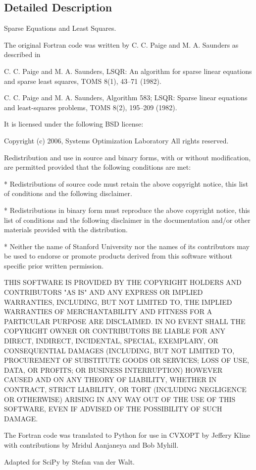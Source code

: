 \subsection{Detailed Description}
\begin{DoxyVerb}Sparse Equations and Least Squares.

The original Fortran code was written by C. C. Paige and M. A. Saunders as
described in

C. C. Paige and M. A. Saunders, LSQR: An algorithm for sparse linear
equations and sparse least squares, TOMS 8(1), 43--71 (1982).

C. C. Paige and M. A. Saunders, Algorithm 583; LSQR: Sparse linear
equations and least-squares problems, TOMS 8(2), 195--209 (1982).

It is licensed under the following BSD license:

Copyright (c) 2006, Systems Optimization Laboratory
All rights reserved.

Redistribution and use in source and binary forms, with or without
modification, are permitted provided that the following conditions are
met:

    * Redistributions of source code must retain the above copyright
      notice, this list of conditions and the following disclaimer.

    * Redistributions in binary form must reproduce the above
      copyright notice, this list of conditions and the following
      disclaimer in the documentation and/or other materials provided
      with the distribution.

    * Neither the name of Stanford University nor the names of its
      contributors may be used to endorse or promote products derived
      from this software without specific prior written permission.

THIS SOFTWARE IS PROVIDED BY THE COPYRIGHT HOLDERS AND CONTRIBUTORS
"AS IS" AND ANY EXPRESS OR IMPLIED WARRANTIES, INCLUDING, BUT NOT
LIMITED TO, THE IMPLIED WARRANTIES OF MERCHANTABILITY AND FITNESS FOR
A PARTICULAR PURPOSE ARE DISCLAIMED. IN NO EVENT SHALL THE COPYRIGHT
OWNER OR CONTRIBUTORS BE LIABLE FOR ANY DIRECT, INDIRECT, INCIDENTAL,
SPECIAL, EXEMPLARY, OR CONSEQUENTIAL DAMAGES (INCLUDING, BUT NOT
LIMITED TO, PROCUREMENT OF SUBSTITUTE GOODS OR SERVICES; LOSS OF USE,
DATA, OR PROFITS; OR BUSINESS INTERRUPTION) HOWEVER CAUSED AND ON ANY
THEORY OF LIABILITY, WHETHER IN CONTRACT, STRICT LIABILITY, OR TORT
(INCLUDING NEGLIGENCE OR OTHERWISE) ARISING IN ANY WAY OUT OF THE USE
OF THIS SOFTWARE, EVEN IF ADVISED OF THE POSSIBILITY OF SUCH DAMAGE.

The Fortran code was translated to Python for use in CVXOPT by Jeffery
Kline with contributions by Mridul Aanjaneya and Bob Myhill.

Adapted for SciPy by Stefan van der Walt.\end{DoxyVerb}
 

